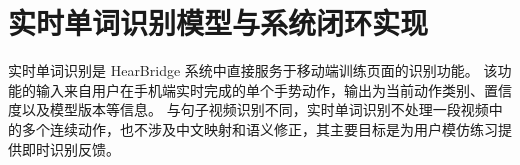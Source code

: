 \section{实时单词识别模型与系统闭环实现}

实时单词识别是 HearBridge 系统中直接服务于移动端训练页面的识别功能。
该功能的输入来自用户在手机端实时完成的单个手势动作，输出为当前动作类别、置信度以及模型版本等信息。
与句子视频识别不同，实时单词识别不处理一段视频中的多个连续动作，也不涉及中文映射和语义修正，其主要目标是为用户模仿练习提供即时识别反馈。







